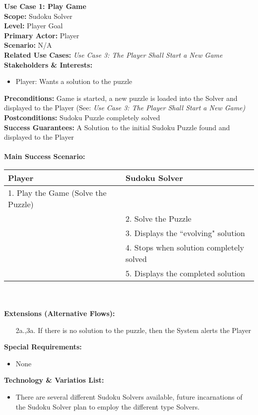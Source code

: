 \documentclass[letterpaper]{article}
\begin{document}
\noindent
\textbf{Use Case 1:  Play Game}\\
\textbf{Scope:  }Sudoku Solver\\
\textbf{Level:  }Player Goal\\
\textbf{Primary Actor:  }Player\\
\textbf{Scenario:  }N/A\\
\textbf{Related Use Cases:  }\textit{Use Case 3:  The Player Shall
Start a New Game}\\
\textbf{Stakeholders \& Interests:}
\begin{itemize}
\item  Player:  Wants a solution to the puzzle
\end{itemize}
\textbf{Preconditions:  }Game is started, a new puzzle is loaded into
the Solver and displayed to the Player (See: \textit{Use Case 3:  The
Player Shall Start a New Game)}\\
\textbf{Postconditions:  }Sudoku Puzzle completely solved\\
\textbf{Success Guarantees:  }A Solution to the initial Sudoku Puzzle
found and displayed to the Player\\\\
\textbf{Main Success Scenario:  }\\
\begin{tabular}{|p{5.75cm}|p{5.75cm}|}\hline
\textbf{Player} & \textbf{Sudoku Solver}\\\hline
1.  Play the Game (Solve the Puzzle) &\\\hline
& 2. Solve the Puzzle\\\hline
& 3. Displays the ``evolving" solution\\\hline
& 4. Stops when solution completely solved\\\hline
& 5. Displays the completed solution\\\hline
\end{tabular}\\\\
\textbf{Extensions (Alternative Flows):}
\begin{itemize}
\item[2a.,3a.]If there is no solution to the puzzle, then the System
alerts the Player
\end{itemize}
\textbf{Special Requirements:}
\begin{itemize}
\item None
\end{itemize}
\textbf{Technology \& Variatios List:}
\begin{itemize}
\item There are several different Sudoku Solvers available, future
incarnations of the Sudoku Solver plan to employ the different type
Solvers.
\end{itemize}
\end{document}

